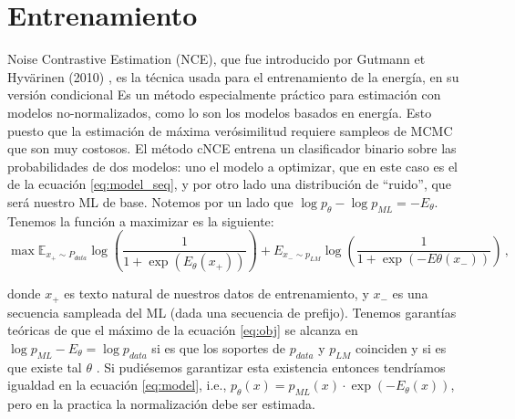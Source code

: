 \documentclass[letterpaper,11pt,oneside]{article}
\theoremstyle{break}
\begin{document}
\section{Entrenamiento}
\iffalse
\subsection{Noise Contrastive Estimation}
\fi
Noise Contrastive Estimation (NCE), que fue introducido por %
Gutmann et Hyvärinen (2010) \cite{nce}, es la técnica usada para el entrenamiento de la energía, en su versión condicional Es un método especialmente práctico para estimación con modelos no-normalizados, como lo son los modelos basados en energía. Esto puesto que la estimación de máxima verósimilitud requiere sampleos de MCMC que son muy costosos. El método cNCE entrena un clasificador binario sobre las probabilidades de dos modelos: uno el modelo a optimizar, que en este caso es el de la ecuación \ref{eq:model_seq}, y por otro lado una distribución de ``ruido'', que será nuestro ML de base. Notemos por un lado que $\log p_\theta - \log p_{ML} = -E_\theta$. Tenemos la función a maximizar es la siguiente:
\begin{equation}
\label{eq:obj}
    \max \mathbb{E}_{x_+\sim P_{data}}\log\left(\frac{1}{1+\exp(E_\theta(x_+))}\right) + E_{x_-\sim p_{LM}}\log\left( \frac{1}{1+\exp(-E\theta(x_-))} \right) \,,
\end{equation}
\iffalse
\subsection{Función objetivo}
\fi
donde $x_+$ es texto natural de nuestros datos de entrenamiento, y $x_-$ es una secuencia sampleada del ML (dada una secuencia de prefijo). Tenemos garantías teóricas de que el máximo de la ecuación \ref{eq:obj} se alcanza en $\log p_{ML}-E_\theta =\log p_{data} $ si es que los soportes de $p_{data}$ y $p_{LM}$ coinciden y si es que existe tal $\theta$ \cite{nce}. Si pudiésemos garantizar esta existencia entonces tendríamos igualdad en la ecuación \ref{eq:model}, i.e., $p_\theta(x) =   p_{ML}(x) \cdot \exp(-E_\theta(x)) $, pero en la practica la normalización debe ser estimada.
\end{document}
